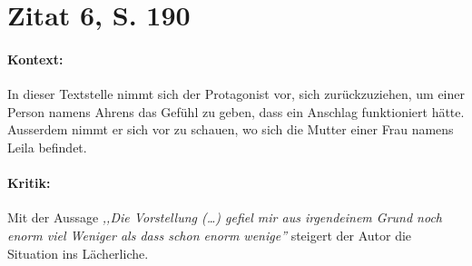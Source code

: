 \documentclass[12pt,twoside,a4paper,twocolumn]{article}
\begin{document}
	
	
	\section{Zitat 6, S. 190}
	
	\paragraph{Kontext:} In dieser Textstelle nimmt sich der Protagonist vor, sich zurückzuziehen, um einer Person namens Ahrens das Gefühl zu geben, dass ein Anschlag funktioniert hätte. Ausserdem nimmt er sich vor zu schauen, wo sich die Mutter einer Frau namens Leila befindet.
	
	\paragraph{Kritik:} Mit der Aussage \textit{,,Die Vorstellung (\dots) gefiel mir aus irgendeinem Grund noch enorm viel Weniger als dass schon enorm wenige''} steigert der Autor die Situation ins Lächerliche.
	
	
\end{document}
